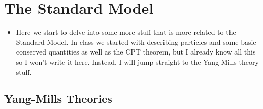 \section{The Standard Model}

\begin{itemize}
    \item Here we start to delve into some more stuff that is more related to the Standard Model. In class we started with describing particles and some basic conserved quantities as well as the CPT theorem, but I already know all this so I won't write it here. Instead, I will jump straight to the Yang-Mills theory stuff.
\end{itemize}



\subsection*{Yang-Mills Theories}

